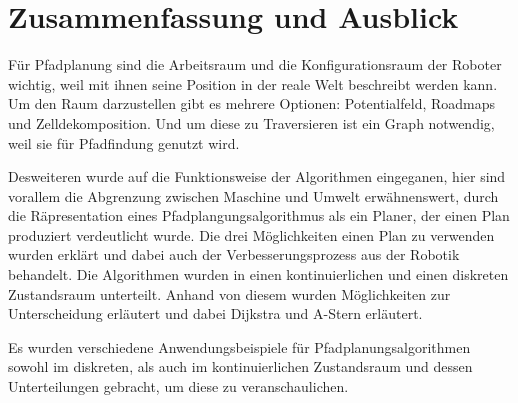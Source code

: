\chapter{Zusammenfassung und Ausblick}

Für Pfadplanung sind die Arbeitsraum und die Konfigurationsraum der Roboter wichtig, weil mit ihnen seine Position in der reale Welt beschreibt werden kann. Um den Raum darzustellen gibt es mehrere Optionen: Potentialfeld, Roadmaps und Zelldekomposition. Und um diese zu Traversieren ist ein Graph notwendig, weil sie für Pfadfindung genutzt wird.

Desweiteren wurde auf die Funktionsweise der Algorithmen eingeganen, hier sind vorallem die Abgrenzung zwischen Maschine und Umwelt erwähnenswert, durch die Räpresentation eines Pfadplangungsalgorithmus als ein Planer, der einen Plan produziert verdeutlicht wurde. Die drei Möglichkeiten einen Plan zu verwenden wurden erklärt und dabei auch der Verbesserungsprozess aus der Robotik behandelt. Die Algorithmen wurden in einen kontinuierlichen und einen diskreten Zustandsraum unterteilt. Anhand von diesem wurden Möglichkeiten zur Unterscheidung erläutert und dabei Dijkstra und A-Stern erläutert. 

Es wurden verschiedene Anwendungsbeispiele für Pfadplanungsalgorithmen sowohl im diskreten, als auch im kontinuierlichen Zustandsraum und dessen Unterteilungen gebracht, um diese zu veranschaulichen.
